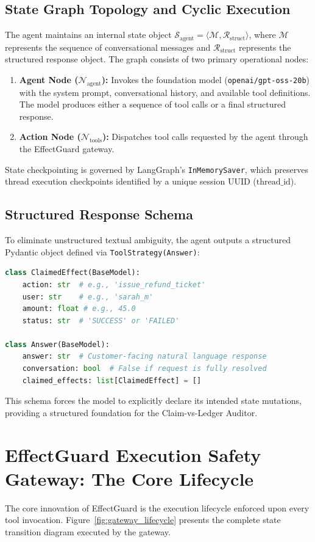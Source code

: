 \subsection{State Graph Topology and Cyclic Execution}
The agent maintains an internal state object $\mathcal{S}_{\text{agent}} = \langle \mathcal{M}, \mathcal{R}_{\text{struct}} \rangle$, where $\mathcal{M}$ represents the sequence of conversational messages and $\mathcal{R}_{\text{struct}}$ represents the structured response object. The graph consists of two primary operational nodes:
\begin{enumerate}
    \item \textbf{Agent Node ($\mathcal{N}_{\text{agent}}$):} Invokes the foundation model (\texttt{openai/gpt-oss-20b}) with the system prompt, conversational history, and available tool definitions. The model produces either a sequence of tool calls or a final structured response.
    \item \textbf{Action Node ($\mathcal{N}_{\text{tools}}$):} Dispatches tool calls requested by the agent through the EffectGuard gateway.
\end{enumerate}

State checkpointing is governed by LangGraph's \texttt{InMemorySaver}, which preserves thread execution checkpoints identified by a unique session UUID ($\text{thread\_id}$).

\subsection{Structured Response Schema}
To eliminate unstructured textual ambiguity, the agent outputs a structured Pydantic object defined via \texttt{ToolStrategy(Answer)}:
\begin{lstlisting}[language=Python]
class ClaimedEffect(BaseModel):
    action: str  # e.g., 'issue_refund_ticket'
    user: str    # e.g., 'sarah_m'
    amount: float # e.g., 45.0
    status: str  # 'SUCCESS' or 'FAILED'

class Answer(BaseModel):
    answer: str  # Customer-facing natural language response
    conversation: bool  # False if request is fully resolved
    claimed_effects: list[ClaimedEffect] = []
\end{lstlisting}
This schema forces the model to explicitly declare its intended state mutations, providing a structured foundation for the Claim-vs-Ledger Auditor.

\section{EffectGuard Execution Safety Gateway: The Core Lifecycle}
\label{sec:design_gateway}
The core innovation of EffectGuard is the execution lifecycle enforced upon every tool invocation. Figure~\ref{fig:gateway_lifecycle} presents the complete state transition diagram executed by the gateway.

